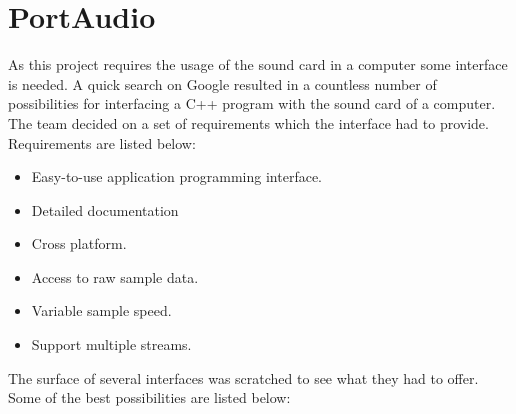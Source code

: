 \chapter{PortAudio}\label{chap:lib}\label{app:portaudio}
As this project requires the usage of the sound card in a computer some interface is needed. A quick search on Google resulted in a countless number of possibilities for interfacing a C++ program with the sound card of a computer. The team decided on a set of requirements which the interface had to provide. Requirements are listed below:

\begin{itemize}
\item Easy-to-use application programming interface.
\item Detailed documentation
\item Cross platform.
\item Access to raw sample data.
\item Variable sample speed.
\item Support multiple streams.
\end{itemize}

The surface of several interfaces was scratched to see what they had to offer. Some of the best possibilities are listed below:

